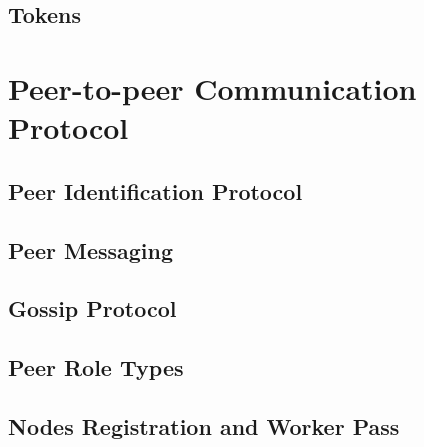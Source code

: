 \documentclass[a4paper, 12pt]{book}
\begin{document}


\section{Tokens}\label{Sec:Tok}






\chapter{Peer-to-peer Communication Protocol} \label{Cha:NAPI}



\section{Peer Identification Protocol}\label{Sec:PIP}



\section{Peer Messaging}



\section{Gossip Protocol}



\section{Peer Role Types}\label{Sec:PRT}


\section{Nodes Registration and Worker Pass}\label{Sec:Reg}


\end{document}
